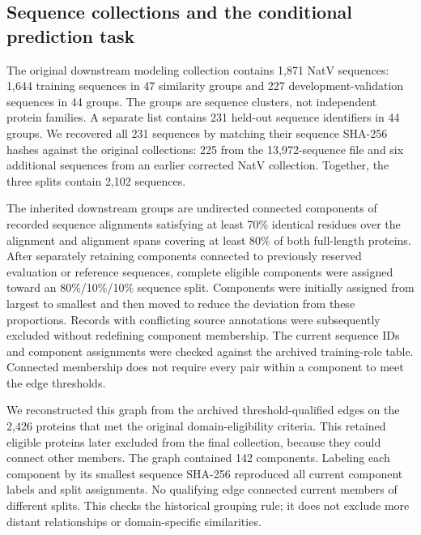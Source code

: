 \documentclass[referee,pdflatex,sn-vancouver-num]{sn-jnl}
\begin{document}
\subsection{Sequence collections and the conditional prediction task}
The original downstream modeling collection contains 1,871 NatV sequences: 1,644 training sequences in 47 similarity groups and 227 development-validation sequences in 44 groups. The groups are sequence clusters, not independent protein families. A separate list contains 231 held-out sequence identifiers in 44 groups. We recovered all 231 sequences by matching their sequence SHA-256 hashes against the original collections: 225 from the 13,972-sequence file and six additional sequences from an earlier corrected NatV collection. Together, the three splits contain 2,102 sequences.

The inherited downstream groups are undirected connected components of recorded sequence alignments satisfying at least 70\% identical residues over the alignment and alignment spans covering at least 80\% of both full-length proteins. After separately retaining components connected to previously reserved evaluation or reference sequences, complete eligible components were assigned toward an 80\%/10\%/10\% sequence split. Components were initially assigned from largest to smallest and then moved to reduce the deviation from these proportions. Records with conflicting source annotations were subsequently excluded without redefining component membership. The current sequence IDs and component assignments were checked against the archived training-role table. Connected membership does not require every pair within a component to meet the edge thresholds.

We reconstructed this graph from the archived threshold-qualified edges on the 2,426 proteins that met the original domain-eligibility criteria. This retained eligible proteins later excluded from the final collection, because they could connect other members. The graph contained 142 components. Labeling each component by its smallest sequence SHA-256 reproduced all current component labels and split assignments. No qualifying edge connected current members of different splits. This checks the historical grouping rule; it does not exclude more distant relationships or domain-specific similarities.
\end{document}
